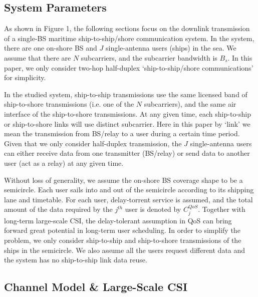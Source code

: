 \documentclass[conference]{IEEEtran}
\begin{document}

\subsection{System Parameters}

As shown in Figure 1, the following sections focus on the downlink transmission of a single-BS maritime ship-to-ship/shore communication system. In the system, there are one on-shore BS
and  $J$ single-antenna users (ships) in the sea. We assume that there are $N$ subcarriers, and the subcarrier bandwidth is ${B_s}$. In this paper, we only consider two-hop half-duplex `ship-to-ship/shore communications' for simplicity. 

In the studied system, ship-to-ship transmissions use the same licensed band of ship-to-shore transmissions (i.e. one of the $N$ subcarriers), and the same air interface of the ship-to-shore transmissions. 
At any given time, each ship-to-ship or ship-to-shore links will use distinct subcarrier. Here in this paper by `link' we mean the transmission from BS/relay to a user during a certain time period. 
Given that we only consider half-duplex transmission, the $J$ single-antenna users can either receive data from one transmitter (BS/relay) or send data to another user (act as a relay) at any given time. 

Without loss of generality, we assume the on-shore BS coverage shape to be a semicircle. 
Each user sails into and out of the semicircle according to its shipping lane and timetable. 
For each user, delay-torrent service is assumed, and the total amount of the data required by the ${j^{th}}$ user is denoted by $C_j^{QoS}$. Together with long-term large-scale CSI, the delay-tolerant assumption in QoS can bring forward great potential in long-term user scheduling. 
In order to simplify the problem, we only consider ship-to-ship and ship-to-shore transmissions of the ships in the semicircle. We also assume all the users request different data and the system has no ship-to-ship link data reuse.

\subsection{Channel Model \& Large-Scale CSI}
\end{document}
